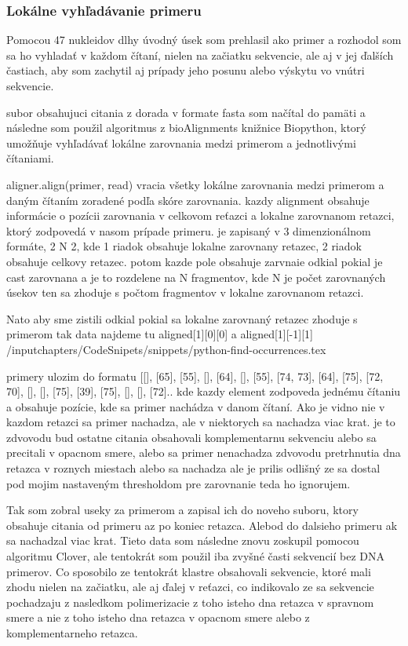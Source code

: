 \subsubsection{Lokálne vyhľadávanie primeru}
Pomocou 47 nukleidov dlhy úvodný úsek som prehlasil ako primer a rozhodol som sa ho vyhladať v každom čítaní, nielen na začiatku sekvencie, ale aj v jej ďalších častiach, aby som zachytil aj prípady jeho posunu alebo výskytu vo vnútri sekvencie.

subor obsahujuci citania z dorada v formate fasta som načítal do pamäti a následne som použil algoritmus z bioAlignments knižnice Biopython, ktorý umožňuje vyhľadávať lokálne zarovnania medzi primerom a jednotlivými čítaniami.

aligner.align(primer, read) vracia všetky lokálne zarovnania medzi primerom a daným čítaním zoradené podľa skóre zarovnania.
kazdy alignment obsahuje informácie o pozícii zarovnania v celkovom reťazci a lokalne zarovnanom retazci, ktorý zodpovedá v nasom prípade primeru.
je zapisaný v 3 dimenzionálnom formáte, 2 N 2, kde 1 riadok obsahuje lokalne zarovnany retazec, 2 riadok obsahuje celkovy retazec. 
potom kazde pole obsahuje zarvnaie odkial pokial je cast zarovnana a je to rozdelene na N fragmentov, kde N je počet zarovnaných úsekov ten sa zhoduje s počtom fragmentov v lokalne zarovnanom retazci.

Nato aby sme zistili odkial pokial sa lokalne zarovnaný retazec zhoduje s primerom tak data najdeme tu aligned[1][0][0] a aligned[1][-1][1]
/input{chapters/CodeSnipets/snippets/python-find-occurrences.tex}

primery ulozim do formatu [[], [65], [55], [], [64], [], [55], [74, 73], [64], [75], [72, 70], [], [], [75], [39], [75], [], [], [72].. 
kde kazdy element zodpoveda jednému čítaniu a obsahuje pozície, kde sa primer nachádza v danom čítaní. Ako je vidno nie v kazdom retazci sa primer nachadza, ale v niektorych sa nachadza viac krat.
je to zdvovodu bud ostatne citania obsahovali komplementarnu sekvenciu alebo sa precitali v opacnom smere, alebo sa primer nenachadza zdvovodu pretrhnutia dna retazca v roznych miestach 
alebo sa nachadza ale je prilis odlišný ze sa dostal pod mojim nastaveným thresholdom pre zarovnanie teda ho ignorujem.


Tak som zobral useky za primerom a zapisal ich do noveho suboru, ktory obsahuje citania od primeru az po koniec retazca. Alebod do dalsieho primeru ak sa nachadzal viac krat.
Tieto data som následne znovu zoskupil pomocou algoritmu Clover, ale tentokrát som použil iba zvyšné časti sekvencií bez DNA primerov.
Co sposobilo ze tentokrát klastre obsahovali sekvencie, ktoré mali zhodu nielen na začiatku, ale aj ďalej v reťazci, co indikovalo ze sa sekvencie pochadzaju z nasledkom polimerizacie z toho isteho dna retazca v spravnom smere a nie z toho isteho dna retazca v opacnom smere alebo z komplementarneho retazca.


